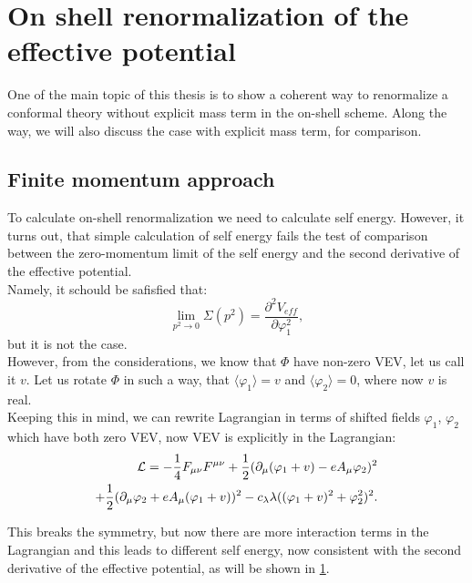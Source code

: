 \chapter{On shell renormalization of the effective potential}

One of the main topic of this thesis is to show a coherent way to renormalize a conformal theory 
without explicit mass term in the on-shell scheme. Along the way, we will also discuss 
the case with explicit mass term, for comparison.\\

\section{Finite momentum approach}\label{finite momentum}
To calculate on-shell renormalization we need to calculate self energy. 
However, it turns out, that simple calculation of self energy fails the test of 
comparison between the zero-momentum limit of the self energy and the second derivative 
of the effective potential. \\
Namely, it schould be safisfied that:
\begin{equation}\label{second_derivativ_condition}
\lim\limits_{p^2\to 0}\Sigma(p^2)=\frac{\partial^2V_{eff}}{\partial\varphi_1^2},
\end{equation}
but it is not the case. \\

However, from the \MSbar considerations, we know that $\Phi$ have non-zero VEV, let us 
call it $v$. 
Let us rotate $\Phi$ in such a way, that $\langle\varphi_1\rangle=v$ and $\langle\varphi_2\rangle 
= 0$, where now $v$ is real. \\
Keeping this in mind, we can rewrite Lagrangian in terms of shifted fields $\varphi_1$, 
$\varphi_2$ which have both zero VEV, now VEV is explicitly in the Lagrangian:
\begin{align}\label{no_mass_term}
\mathcal{L} = -\frac{1}{4}F_{\mu\nu}F^{\mu\nu}+ 
\frac{1}{2}(\partial_\mu(\varphi_1+v) - eA_\mu\varphi_2)^2\\
+\frac{1}{2}(\partial_\mu\varphi_2+eA_\mu(\varphi_1+v))^2
-c_\lambda\lambda((\varphi_1+v)^2+\varphi_2^2)^2. \notag
\end{align}

This breaks the symmetry, but now there are more interaction terms in the Lagrangian and this leads 
to different self energy, now consistent with the second derivative of the effective potential, 
as will be shown in \ref{}. \\ 

